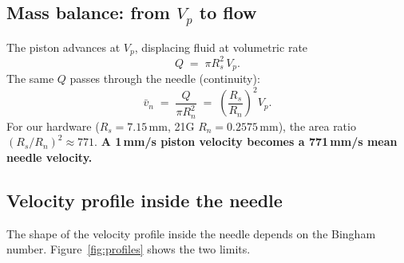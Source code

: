\documentclass[11pt,a4paper]{article}
\begin{document}
\subsection{Mass balance: from $V_p$ to flow}

The piston advances at $V_p$, displacing fluid at volumetric rate
\begin{equation}
Q \;=\; \pi R_s^2 \, V_p.
\label{eq:Q_from_Vp}
\end{equation}
The same $Q$ passes through the needle (continuity):
\begin{equation}
\bar v_n \;=\; \frac{Q}{\pi R_n^2}
           \;=\; \left(\frac{R_s}{R_n}\right)^2 V_p.
\label{eq:vbar_n}
\end{equation}
For our hardware ($R_s=7.15$\,mm, 21G $R_n=0.2575$\,mm), the area ratio
$(R_s/R_n)^2\approx 771$. \textbf{A 1\,\si{\mm/\s} piston velocity
becomes a 771\,\si{\mm/\s} mean needle velocity.}

\subsection{Velocity profile inside the needle}
\label{sec:velocity_profile}

The shape of the velocity profile inside the needle depends on the Bingham
number. Figure~\ref{fig:profiles} shows the two limits.
\end{document}
